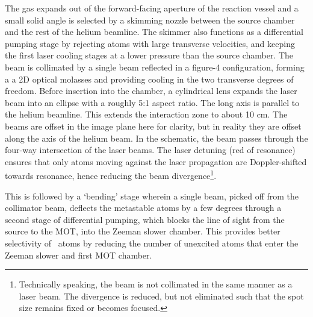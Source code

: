 	The gas expands out of the forward-facing aperture of the reaction vessel and a small solid angle is selected by a skimming nozzle between the source chamber and the rest of the helium beamline.
	The skimmer also functions as a differential pumping stage by rejecting atoms with large transverse velocities, and keeping the first laser cooling stages at a lower pressure than the source chamber.
	The beam is collimated by a single beam reflected in a figure-4 configuration, forming a a 2D optical molasses \cite{Lett81,Rooijakkers96} and providing cooling in the two transverse degrees of freedom.
	Before insertion into the chamber, a cylindrical lens expands the laser beam into an ellipse with a roughly 5:1 aspect ratio. The long axis is parallel to the helium beamline. 
	This extends the interaction zone to about 10 cm. 
	The beams are offset in the image plane here for clarity, but in reality they are offset along the axis of the helium beam.
	In the schematic, the beam passes through the four-way intersection of the laser beams. 
	The laser detuning (red of resonance) ensures that only atoms moving against the laser propagation are Doppler-shifted towards resonance, hence reducing the beam divergence\footnote{Technically speaking, the beam is not collimated in the same manner as a laser beam.
	The divergence is reduced, but not eliminated such that the spot size remains fixed or becomes focused.}.


	This is followed by a `bending' stage wherein a single beam, picked off from the collimator beam, deflects the metastable atoms by a few degrees through a second stage of differential pumping, which blocks the line of sight from the source to the MOT, into the Zeeman slower chamber.
	This provides better selectivity of \mhe~atoms by reducing the number of unexcited atoms that enter the Zeeman slower and first MOT chamber.

